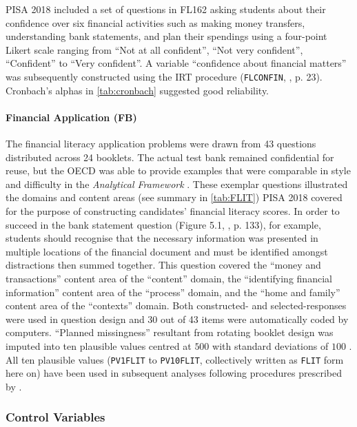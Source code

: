 PISA 2018 included a set of questions in \textsf{FL162} asking students about their confidence over six financial activities such as making money transfers, understanding bank statements, and plan their spendings using a four-point Likert scale ranging from ``Not at all confident'', ``Not very confident'', ``Confident'' to ``Very confident''. A variable ``confidence about financial matters'' was subsequently constructed using the IRT procedure (\texttt{FLCONFIN}, \citet{PISAtech}, p. 23). Cronbach's alphas in \cref{tab:cronbach} suggested good reliability.

%

\paragraph{Financial Application (FB)}

The financial literacy application problems were drawn from 43 questions distributed across 24 booklets. The actual test bank remained confidential for reuse, but the OECD was able to provide examples that were comparable in style and difficulty in the \textit{Analytical Framework} \citep[][pp. 133--148]{PISAframework}. These exemplar questions illustrated the domains and content areas (see summary in \cref{tab:FLIT}) PISA 2018 covered for the purpose of constructing candidates' financial literacy scores. In order to succeed in the bank statement question (Figure 5.1, \citet{PISAframework}, p. 133), for example, students should recognise that the necessary information was presented in multiple locations of the financial document and must be identified amongst distractions then summed together. This question covered the ``money and transactions'' content area of the ``content'' domain, the ``identifying financial information'' content area of the ``process'' domain, and the ``home and family'' content area of the ``contexts'' domain. Both constructed- and selected-responses were used in question design and 30 out of 43 items were automatically coded by computers. ``Planned missingness'' resultant from rotating booklet design was imputed into ten plausible values \citep{vondavier:2014} centred at $500$ with standard deviations of $100$ \citep{PISAframework}. All ten plausible values (\texttt{PV1FLIT} to \texttt{PV10FLIT}, collectively written as \texttt{FLIT} form here on) have been used in subsequent analyses following procedures prescribed by \citet{rubin:1987}.

\subsubsection{Control Variables}

